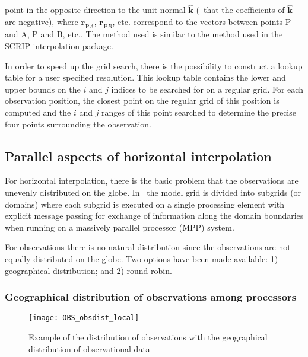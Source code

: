 \documentclass[../main/NEMO_manual]{subfiles}
\begin{document}
point in the opposite direction to the unit normal $\widehat{\mathbf k}$
(\ie\ that the coefficients of $\widehat{\mathbf k}$ are negative),
where ${{\mathbf r}_{}}_{\mathrm PA}$, ${{\mathbf r}_{}}_{\mathrm PB}$, etc. correspond to
the vectors between points P and A, P and B, etc..
The method used is similar to the method used in the \href{https://github.com/SCRIP-Project/SCRIP}{SCRIP interpolation package}.

In order to speed up the grid search, there is the possibility to construct a lookup table for a user specified resolution.
This lookup table contains the lower and upper bounds on the $i$ and $j$ indices to
be searched for on a regular grid.
For each observation position, the closest point on the regular grid of this position is computed and
the $i$ and $j$ ranges of this point searched to determine the precise four points surrounding the observation.

\subsection{Parallel aspects of horizontal interpolation}
\label{subsec:OBS_parallel}

For horizontal interpolation, there is the basic problem that
the observations are unevenly distributed on the globe.
In \NEMO\ the model grid is divided into subgrids (or domains) where
each subgrid is executed on a single processing element with explicit message passing for
exchange of information along the domain boundaries when running on a massively parallel processor (MPP) system.

For observations there is no natural distribution since the observations are not equally distributed on the globe.
Two options have been made available:
1) geographical distribution;
and 2) round-robin.

\subsubsection{Geographical distribution of observations among processors}

\begin{figure}
  \centering
  \texttt{[image: OBS\_obsdist\_local]}
  \caption[Observations with the geographical distribution]{
    Example of the distribution of observations with
    the geographical distribution of observational data}
  \label{fig:OBS_local}
\end{figure}
\end{document}
